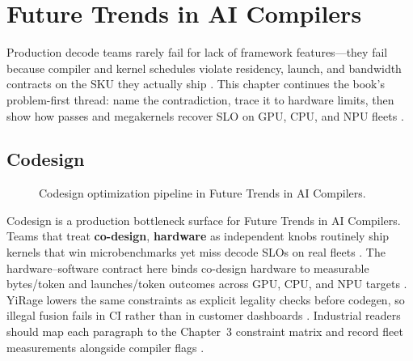 \chapter{Future Trends in AI Compilers}
\label{chap:ch27}

Production decode teams rarely fail for lack of framework features---they fail because compiler and kernel schedules violate residency, launch, and bandwidth contracts on the SKU they actually ship \citep{patel2025llminference,nvidia2022hopper}. This chapter continues the book's problem-first thread: name the contradiction, trace it to hardware limits, then show how passes and megakernels recover SLO on GPU, CPU, and NPU fleets \citep{taxbreak2026,semianalysis2024tma}.

\section{Codesign}
\label{sec:codesign}
\begin{figure}[t]
\centering
{}
\caption{Codesign optimization pipeline in Future Trends in AI Compilers.}
\label{fig:codesign_pipeline}
\end{figure}


Codesign is a production bottleneck surface for Future Trends in AI Compilers. Teams that treat \textbf{co-design}, \textbf{hardware} as independent knobs routinely ship kernels that win microbenchmarks yet miss decode SLOs on real fleets \citep{patel2025llminference,nvidia2022hopper}. The hardware--software contract here binds co-design hardware to measurable bytes/token and launches/token outcomes across GPU, CPU, and NPU targets \citep{taxbreak2026,semianalysis2024tma}. YiRage lowers the same constraints as explicit legality checks before codegen, so illegal fusion fails in CI rather than in customer dashboards \citep{memoryfloor2026,amd2024xdna}. Industrial readers should map each paragraph to the Chapter~3 constraint matrix and record fleet measurements alongside compiler flags \citep{nvidia2022hopper,amd2024aie}.

